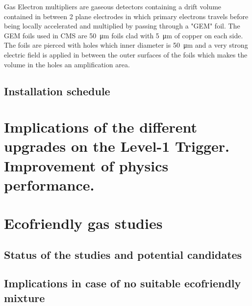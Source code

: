 	Gas Electron multipliers are gaseous detectors containing a drift volume contained in between 2 plane electrodes in which primary electrons travels before being locally accelerated and multiplied by passing through a "GEM" foil. The GEM foils used in CMS are \SI{50}{\micro m} foils clad with \SI{5}{\micro m} of copper on each side. The foils are pierced with holes which inner diameter is \SI{50}{\micro m} and a very strong electric field is applied in between the outer surfaces of the foils which makes the volume in the holes an amplification area.
	
	\subsection{Installation schedule}
	\label{chapt3:ssec:schedule}

\section{Implications of the different upgrades on the Level-1 Trigger. Improvement of physics performance.}
\label{chapt3:sec:L1tP2}

\section{Ecofriendly gas studies}
\label{chapt3:sec:EcoGas}

	\subsection{Status of the studies and potential candidates}
	\label{chapt3:ssec:GasStatus}

	\subsection{Implications in case of no suitable ecofriendly mixture}
	\label{chapt3:ssec:GasConsequences}

\clearpage{\pagestyle{empty}\cleardoublepage}